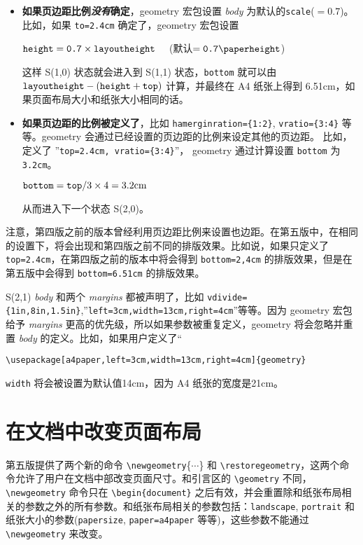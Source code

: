 \documentclass[titlepage]{ctexart}
\def\Gm{\textsf{geometry}}
\newcommand{\gpart}[1]{\textsf{\textsl{\color[rgb]{.0,.45,.7}#1}}}
\newenvironment{Spec}%
  {\begin{list}{}{%
   \renewcommand{\makelabel}[1]{\fbox{##1}\hfil}%
   \setlength{\itemsep}{-.5\parsep}
   \settowidth{\labelwidth}{\texttt{S(x,x)}}%
   \setlength{\leftmargin}{\labelwidth}%
   \addtolength{\leftmargin}{\labelsep}%
   \addtolength{\leftmargin}{2em}%
   \setlength{\rightmargin}{2em}}%
   \raggedright}
  {\end{list}}
\begin{document}
\begin{Spec}
	 \begin{itemize}\setlength{\itemsep}{-.5\parsep}
	 \item \textbf{如果页边距比例\textit{没有}确定}，\Gm{} 宏包设置 \gpart{body} 为默认的\verb|scale|($=0.7$)。
	 比如，如果 \verb|to=2.4cm| 确定了，\Gm{} 宏包设置
	 \begin{center}
	 $\verb|height|= \verb|0.7|\times\verb|layoutheight|$
	 ~~(默认$=\verb|0.7\paperheight|$)
	 \end{center} 
	 这样 S(1,0) 状态就会进入到 S(1,1) 状态，\verb|bottom| 就可以由 $\verb|layoutheight|-(\verb|height|+\verb|top|)$ 计算，并最终在 A4 纸张上得到 6.51cm，如果页面布局大小和纸张大小相同的话。
	 \medskip
	 \item \textbf{如果页边距的比例被定义了}，比如 \verb|hamerginration={1:2}|, \verb|vratio={3:4}| 等等。\Gm{} 会通过已经设置的页边距的比例来设定其他的页边距。
	 比如，定义了 ''\verb|top=2.4cm, vratio={3:4}|''， \Gm{} 通过计算设置 \verb|bottom| 为 \verb|3.2cm|。
	 \begin{center}
	 $\verb|bottom| = \verb|top|/3\times 4 = 3.2\textrm{cm}$
	 \end{center} 
	从而进入下一个状态 S(2,0)。
	\end{itemize}
	
	注意，第四版之前的版本曾经利用页边距比例来设置也边距。在第五版中，在相同的设置下，将会出现和第四版之前不同的排版效果。比如说，如果只定义了 \verb|top=2.4cm|，在第四版之前的版本中将会得到 \verb|bottom=2,4cm| 的排版效果，但是在第五版中会得到 \verb|bottom=6.51cm| 的排版效果。
	\bigskip
	
	\item[S(2,1)]
	\gpart{body} 和两个 \gpart{margins} 都被声明了，比如 \verb|vdivide={1in,8in,1.5in}|,''\verb|left=3cm,width=13cm,right=4cm|''等等。因为 \Gm{} 宏包给予 \gpart{margins} 更高的优先级，所以如果参数被重复定义，\Gm{} 将会忽略并重置 \gpart{body} 的定义。比如，如果用户定义了“
	\begin{center}
	\verb|\usepackage[a4paper,left=3cm,width=13cm,right=4cm]{geometry}|
	\end{center} 
	\verb|width| 将会被设置为默认值14cm，因为 A4 纸张的宽度是21cm。
	 \end{Spec}
	 \section{在文档中改变页面布局}\label{sec:midchange}
	 
	 第五版提供了两个新的命令 \verb|\newgeometry|\{$\cdots$\} 和 \verb|\restoregeometry|，这两个命令允许了用户在文档中部改变页面尺寸。和引言区的 \verb|\geometry| 不同，\verb|\newgeometry| 命令只在 \verb|\begin{document}| 之后有效，并会重置除和纸张布局相关的参数之外的所有参数。和纸张布局相关的参数包括：\verb|landscape|, \verb|portrait| 和 纸张大小的参数(\verb|papersize|, \verb|paper=a4paper| 等等)，这些参数不能通过 \verb|\newgeometry| 来改变。
	 
\end{document}
